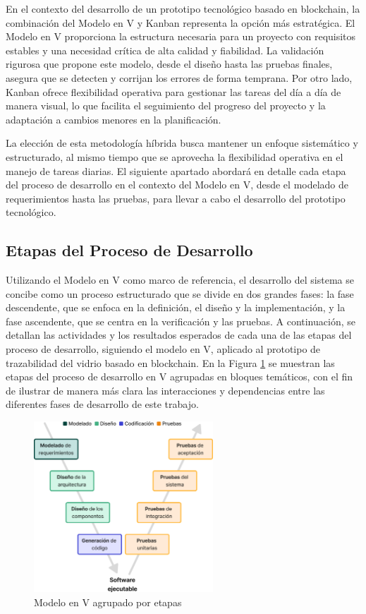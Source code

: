 En el contexto del desarrollo de un prototipo tecnológico basado en blockchain, la combinación del Modelo en V y Kanban representa la opción más estratégica. El Modelo en V proporciona la estructura necesaria para un proyecto con requisitos estables y una necesidad crítica de alta calidad y fiabilidad. La validación rigurosa que propone este modelo, desde el diseño hasta las pruebas finales, asegura que se detecten y corrijan los errores de forma temprana. Por otro lado, Kanban ofrece flexibilidad operativa para gestionar las tareas del día a día de manera visual, lo que facilita el seguimiento del progreso del proyecto y la adaptación a cambios menores en la planificación.

La elección de esta metodología híbrida busca mantener un enfoque sistemático y estructurado, al mismo tiempo que se aprovecha la flexibilidad operativa en el manejo de tareas diarias. El siguiente apartado abordará en detalle cada etapa del proceso de desarrollo en el contexto del Modelo en V, desde el modelado de requerimientos hasta las pruebas, para llevar a cabo el desarrollo del prototipo tecnológico.

\subsection{Etapas del Proceso de Desarrollo}

Utilizando el Modelo en V como marco de referencia, el desarrollo del sistema se concibe como un proceso estructurado que se divide en dos grandes fases: la fase descendente, que se enfoca en la definición, el diseño y la implementación, y la fase ascendente, que se centra en la verificación y las pruebas. A continuación, se detallan las actividades y los resultados esperados de cada una de las etapas del proceso de desarrollo, siguiendo el modelo en V, aplicado al prototipo de trazabilidad del vidrio basado en blockchain. En la Figura \ref{fig:methodology-v-grouped} se muestran las etapas del proceso de desarrollo en V agrupadas en bloques temáticos, con el fin de ilustrar de manera más clara las interacciones y dependencias entre las diferentes fases de desarrollo de este trabajo.

\begin{figure}[!htb]
	\centering
	\includegraphics[width=0.6\textwidth]{Figures/model-v-grouped.png}
	\caption{Modelo en V agrupado por etapas}
    \label{fig:methodology-v-grouped}
\end{figure}



